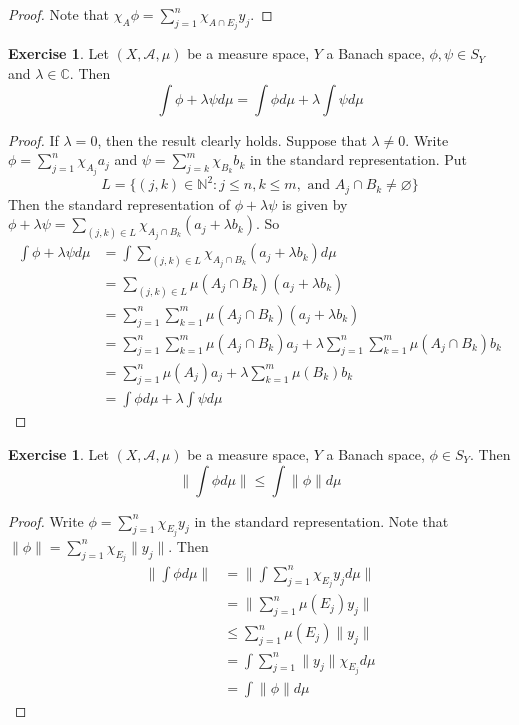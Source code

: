 \documentclass[12pt]{amsart}
\theoremstyle{definition}
\newtheorem{ex}[definition]{Exercise}
\newcommand{\lam}{\lambda}
\newcommand{\C}{\mathbb{C}}
\newcommand{\N}{\mathbb{N}}
\newcommand{\MA}{\mathcal{A}}
\begin{document}
	\begin{proof}
	Note that $\chi_A \phi = \sum\limits_{j=1}^n\chi_{A \cap E_j}y_j$.
	\end{proof}		
	
	\begin{ex}
	Let $(X, \MA, \mu)$ be a measure space, $Y$ a Banach space, $\phi, \psi \in S_Y$ and $\lam \in \C$. Then $$\int \phi + \lam \psi d\mu = \int \phi d \mu + \lam \int \psi d\mu $$
	\end{ex}
	
	\begin{proof}
	If $\lam =0$, then the result clearly holds. Suppose that $\lam \neq 0$.	Write $\phi = \sum\limits_{j=1}^n\chi_{A_j}a_j$ and $\psi = \sum\limits_{j=k}^m\chi_{B_k}b_k$ in the standard representation. Put $$L = \{(j,k) \in \N^2: j \leq n, k \leq m, \text{ and } A_j \cap B_k \neq \varnothing\}$$ Then the standard representation of $\phi + \lam \psi$ is given by  $\phi + \lam \psi = \sum\limits_{(j,k) \in L} \chi_{A_j \cap B_k}(a_j + \lam b_k)$.
	So 
	\begin{align*}
	\int \phi + \lam \psi d \mu 
	&= \int \sum_{(j,k) \in L} \chi_{A_j \cap B_k}(a_j + \lam b_k) d \mu \\
	&= \sum_{(j,k) \in L} \mu(A_j \cap B_k)(a_j + \lam b_k) \\
	&= \sum_{j = 1}^n \sum_{k=1}^m \mu(A_j \cap B_k)(a_j + \lam b_k)  \\ 
	&= \sum_{j = 1}^n \sum_{k=1}^m \mu(A_j \cap B_k)a_j + \lam \sum_{j = 1}^n \sum_{k=1}^m \mu(A_j \cap B_k) b_k \\
	&= \sum_{j = 1}^n \mu(A_j)a_j +  \lam\sum_{k=1}^m \mu(B_k) b_k \\
	&= \int \phi d \mu + \lam \int \psi d\mu 
	\end{align*}
	\end{proof}

	\begin{ex}
	Let $(X, \MA, \mu)$ be a measure space, $Y$ a Banach space, $\phi \in S_Y$. Then $$\bigg \| \int \phi d\mu   \bigg \|  \leq \int \|\phi \| d \mu$$
	\end{ex}
	
	\begin{proof}
	Write $\phi = \sum\limits_{j=1}^n\chi_{E_j}y_j$ in the standard representation. Note that $\|\phi \| = \sum\limits_{j=1}^n\chi_{E_j} \|y_j\|$. Then 
	\begin{align*}
	\bigg \|  \int \phi d\mu  \bigg \| 
	&=  \bigg \|  \int \sum\limits_{j=1}^n\chi_{E_j}y_j  d\mu  \bigg \| \\
	&= \bigg \| \sum\limits_{j=1}^n \mu(E_j)y_j \bigg \| \\
	& \leq \sum\limits_{j=1}^n \mu(E_j) \|y_j \| \\
	&= \int \sum\limits_{j=1}^n \|y_j \| \chi_{E_j} d \mu \\
	&= \int \|\phi \| d\mu
	\end{align*}
	\end{proof}
	
\end{document}
